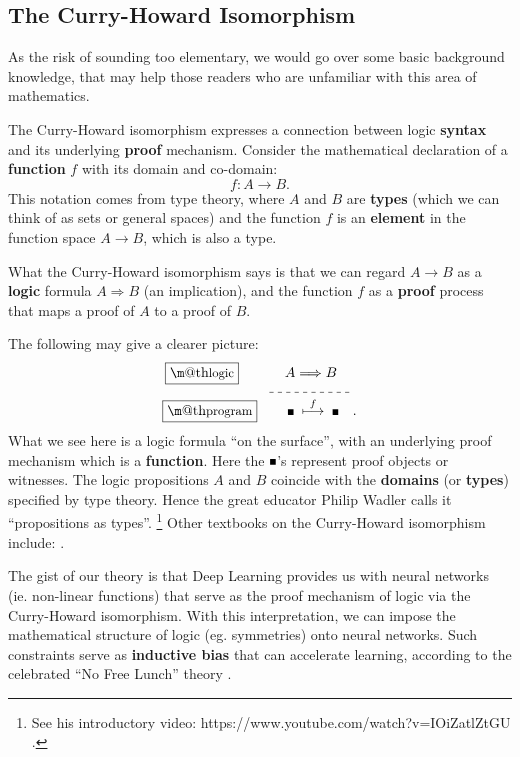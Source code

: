 \documentclass[orivec]{llncs}
\makeatletter
\newcommand{\witness}{\scalebox{0.6}{$\blacksquare$}}
\newcommand{\underdash}[1]{%
	\tikz[baseline=(toUnderline.base)]{
		\node[inner sep=1pt,outer sep=10pt] (toUnderline) {#1};
		\draw[dashed] ([yshift=-0pt]toUnderline.south west) -- ([yshift=-0pt]toUnderline.south east);
	}%
}%
\renewcommand{\boxed}[1]{\fbox{\m@th$\displaystyle\scalebox{0.9}{#1}$} \,}
\makeatother
\begin{document}
\subsection{The Curry-Howard Isomorphism}

As the risk of sounding too elementary, we would go over some basic background knowledge, that may help those readers who are unfamiliar with this area of mathematics.

The Curry-Howard isomorphism expresses a connection between logic \textbf{syntax} and its underlying \textbf{proof} mechanism.  Consider the mathematical declaration of a \textbf{function} $f$ with its domain and co-domain:
\begin{equation}
f: A \rightarrow B .
\end{equation}
This notation comes from type theory, where $A$ and $B$ are \textbf{types} (which we can think of as sets or general spaces) and the function $f$ is an \textbf{element} in the function space $A \rightarrow B$, which is also a type.

What the Curry-Howard isomorphism says is that we can regard $A \rightarrow B$ as a \textbf{logic} formula $A \Rightarrow B$ (an implication), and the function $f$ as a \textbf{proof} process that maps a proof of $A$ to a proof of $B$.

The following may give a clearer picture:
\begin{equation}
\label{eqn:Curry-Howard}
\begin{aligned}
\boxed{\mbox{logic}} \quad \quad \underdash{$A \Longrightarrow B$} & \\
\boxed{\mbox{program}} \quad \quad \witness \; \stackrel{f}{\longmapsto} \; \witness \hspace*{10pt} & .
\end{aligned}
\end{equation}
What we see here is a logic formula ``on the surface'', with an underlying proof mechanism which is a \textbf{function}.  Here the $\witness$'s represent proof objects or witnesses.  The logic propositions $A$ and $B$ coincide with the \textbf{domains} (or \textbf{types}) specified by type theory.  Hence the great educator Philip Wadler calls it ``propositions as types''. \footnote{See his introductory video: https://www.youtube.com/watch?v=IOiZatlZtGU .} 
Other textbooks on the Curry-Howard isomorphism include: \cite{Sorensen2006} \cite{Simmons2000} \cite{Thompson1991}.

The gist of our theory is that Deep Learning provides us with neural networks (ie. non-linear functions) that serve as the proof mechanism of logic via the Curry-Howard isomorphism.  With this interpretation, we can impose the mathematical structure of logic (eg. symmetries) onto neural networks.  Such constraints serve as \textbf{inductive bias} that can accelerate learning, according to the celebrated ``No Free Lunch'' theory \cite{Wolpert1997} \cite{Alpaydin2020} \cite{Shalev-Shwartz2014}.
\end{document}
